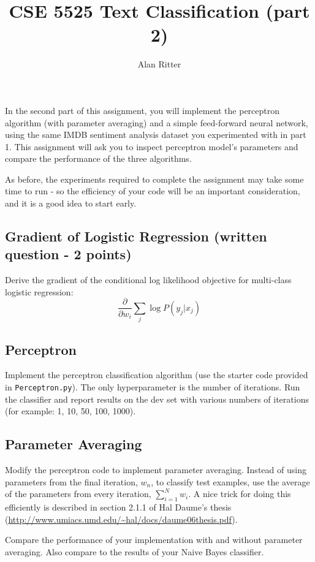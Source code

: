 \documentclass[12pt, letterpaper]{article}
\begin{document}
\title{CSE 5525 Text Classification (part 2)}
\author{Alan Ritter}
\date{}
\maketitle

In the second part of this assignment, you will implement the perceptron algorithm (with parameter averaging) and a simple feed-forward neural network, using the same IMDB sentiment analysis dataset you experimented with in part 1.  This assignment will ask you to inspect perceptron model's parameters and compare the performance of the three algorithms.

As before, the experiments required to complete the assignment may take some time to run - so the efficiency of your code will be an important consideration, and it is a good idea to start early.

\subsection*{Gradient of Logistic Regression (written question - 2 points)}
Derive the gradient of the conditional log likelihood objective for multi-class logistic regression:
\begin{equation}
\frac{\partial}{\partial w_i} \sum_{j} \log P(y_j|x_j)
\end{equation}

\subsection*{Perceptron}
Implement the perceptron classification algorithm (use the starter code provided in {\tt Perceptron.py}).
The only hyperparameter is the number of iterations.  Run the classifier and report results on the dev set with
various numbers of iterations (for example: 1, 10, 50, 100, 1000).

\subsection*{Parameter Averaging}
Modify the perceptron code to implement parameter averaging.  Instead of using parameters from the final iteration, $w_n$, to classify test examples, 
use the average of the parameters from every iteration, $\sum_{i=1}^N w_i$.  A nice trick for doing this efficiently is described in section 2.1.1 of Hal Daume's thesis
(\url{http://www.umiacs.umd.edu/~hal/docs/daume06thesis.pdf}).

Compare the performance of your implementation with and without parameter averaging.  Also compare to the results of your Naive Bayes classifier.
\end{document}
